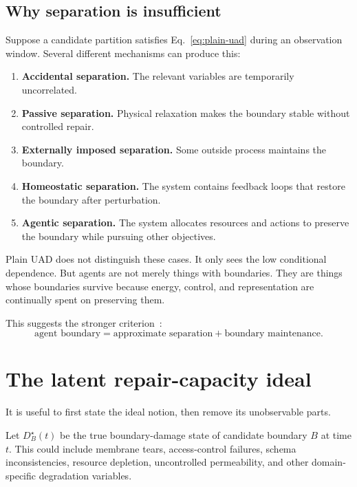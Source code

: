 \documentclass[11pt]{article}
\begin{document}
\subsection{Why separation is insufficient}

Suppose a candidate partition satisfies Eq.~\ref{eq:plain-uad} during an observation window. Several different mechanisms can produce this:

\begin{enumerate}[label=(\alph*)]
  \item \textbf{Accidental separation.} The relevant variables are temporarily uncorrelated.
  \item \textbf{Passive separation.} Physical relaxation makes the boundary stable without controlled repair.
  \item \textbf{Externally imposed separation.} Some outside process maintains the boundary.
  \item \textbf{Homeostatic separation.} The system contains feedback loops that restore the boundary after perturbation.
  \item \textbf{Agentic separation.} The system allocates resources and actions to preserve the boundary while pursuing other objectives.
\end{enumerate}

Plain UAD does not distinguish these cases. It only sees the low conditional dependence. But agents are not merely things with boundaries. They are things whose boundaries survive because energy, control, and representation are continually spent on preserving them.

This suggests the stronger criterion~\cite{ConantAshby1970}:
\begin{equation}
  \text{agent boundary}
  =
  \text{approximate separation}
  +
  \text{boundary maintenance}.
\end{equation}

\section{The latent repair-capacity ideal}

It is useful to first state the ideal notion, then remove its unobservable parts.

Let $D_B^\star(t)$ be the true boundary-damage state of candidate boundary $B$ at time $t$. This could include membrane tears, access-control failures, schema inconsistencies, resource depletion, uncontrolled permeability, and other domain-specific degradation variables.
\end{document}
